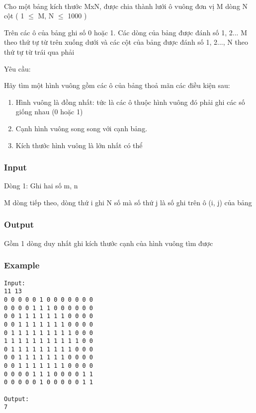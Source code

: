 

 

Cho một bảng kích thước MxN, được chia thành lưới ô vuông đơn vị M dòng N cột ( 1  $\le$  M, N  $\le$  1000 )

Trên các ô của bảng ghi số 0 hoặc 1. Các dòng của bảng được đánh số 1, 2... M theo thứ tự từ trên xuống dưới và các cột của bảng được đánh số 1, 2..., N theo thứ tự từ trái qua phải

Yêu cầu:

Hãy tìm một hình vuông gồm các ô của bảng thoả mãn các điều kiện sau:
\begin{enumerate}
	\item Hình vuông là đồng nhất: tức là các ô thuộc hình vuông đó phải ghi các số giống nhau (0 hoặc 1)
	\item Cạnh hình vuông song song với cạnh bảng.
	\item Kích thước hình vuông là lớn nhất có thể
\end{enumerate}

\subsubsection{Input}

Dòng 1: Ghi hai số m, n

M dòng tiếp theo, dòng thứ i ghi N số mà số thứ j là số ghi trên ô (i, j) của bảng

\subsubsection{Output}

Gồm 1 dòng duy nhất ghi kích thước cạnh của hình vuông tìm được

\subsubsection{Example}
\begin{verbatim}
Input:
11 13
0 0 0 0 0 1 0 0 0 0 0 0 0
0 0 0 0 1 1 1 0 0 0 0 0 0
0 0 1 1 1 1 1 1 1 0 0 0 0
0 0 1 1 1 1 1 1 1 0 0 0 0
0 1 1 1 1 1 1 1 1 1 0 0 0
1 1 1 1 1 1 1 1 1 1 1 0 0
0 1 1 1 1 1 1 1 1 1 0 0 0
0 0 1 1 1 1 1 1 1 0 0 0 0
0 0 1 1 1 1 1 1 1 0 0 0 0
0 0 0 0 1 1 1 0 0 0 0 1 1
0 0 0 0 0 1 0 0 0 0 0 1 1

Output:
7
\end{verbatim}
